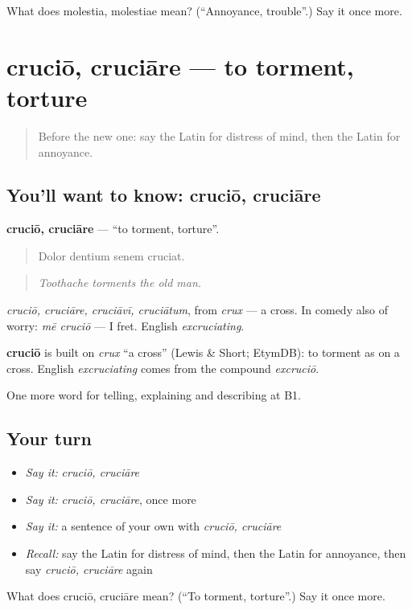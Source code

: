 \begin{tcolorbox}[breakable,colback=teal!4,colframe=teal!35!black,title={Before you move on}]
What does molestia, molestiae mean? (\textquotedblleft{}Annoyance, trouble\textquotedblright{}.) Say it once more.
\end{tcolorbox}
\section[cruciō, cruciāre]{cruciō, cruciāre — to torment, torture}

\label{lesson:LA-C497-crucio}



\begin{quote}
Before the new one: say the Latin for distress of mind, then the Latin for annoyance.
\end{quote}

\subsection*{You'll want to know: cruciō, cruciāre}
\textbf{cruciō, cruciāre} — \textquotedblleft{}to torment, torture\textquotedblright{}.

\begin{quote}
Dolor dentium senem cruciat.
\end{quote}

\begin{quote}
\emph{Toothache torments the old man.}
\end{quote}

\emph{cruciō, cruciāre, cruciāvī, cruciātum}, from \emph{crux} — a cross. In comedy also of worry: \emph{mē cruciō} — I fret. English \emph{excruciating}.

\begin{cousinweb}
\textbf{cruciō} is built on \emph{crux} \textquotedblleft{}a cross\textquotedblright{} (Lewis \& Short; EtymDB): to torment as on a cross. English \emph{excruciating} comes from the compound \emph{excruciō}.
\end{cousinweb}

\begin{grammarlens}[title={What you've built}]
One more word for telling, explaining and describing at B1.
\end{grammarlens}

\subsection*{Your turn}
\begin{itemize}
\raggedright
  \item \emph{Say it:} \emph{cruciō, cruciāre}
  \item \emph{Say it:} \emph{cruciō, cruciāre}, once more
  \item \emph{Say it:} a sentence of your own with \emph{cruciō, cruciāre}
  \item \emph{Recall:} say the Latin for distress of mind, then the Latin for annoyance, then say \emph{cruciō, cruciāre} again
\end{itemize}

\begin{tcolorbox}[breakable,colback=teal!4,colframe=teal!35!black,title={Before you move on}]
What does cruciō, cruciāre mean? (\textquotedblleft{}To torment, torture\textquotedblright{}.) Say it once more.
\end{tcolorbox}
